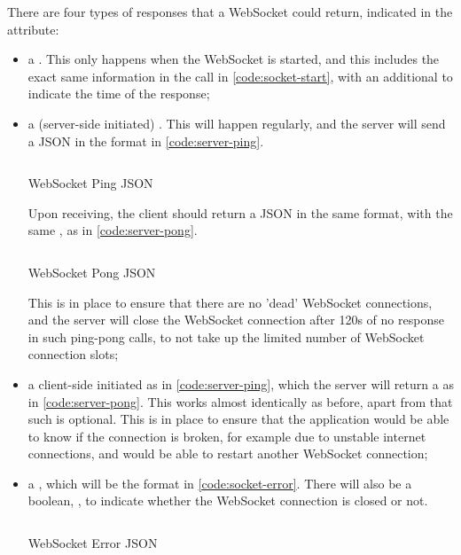 There are four types of responses that a WebSocket could return, indicated in the  attribute:
\begin{itemize}
    \item a . This only happens when the WebSocket is started, and this includes the exact same information in the  call in \autoref{code:socket-start}, with an additional  to indicate the time of the response;
    \item a (server-side initiated) . This will happen regularly, and the server will send a JSON in the format in \autoref{code:server-ping}.
          \begin{listing}[htp]
              \inputminted{json}{code/ServerPing.json}
              \caption{WebSocket Ping JSON}
              \label{code:server-ping}
          \end{listing}

          Upon receiving, the client should return a  JSON in the same format, with the same , as in \autoref{code:server-pong}.

          \begin{listing}[htp]
              \inputminted{json}{code/ServerPong.json}
              \caption{WebSocket Pong JSON}
              \label{code:server-pong}
          \end{listing}

          This is in place to ensure that there are no 'dead' WebSocket connections, and the server will close the WebSocket connection after 120s of no response in such ping-pong calls, to not take up the limited number of WebSocket connection slots;
    \item a client-side initiated  as in \autoref{code:server-ping}, which the server will return a  as in \autoref{code:server-pong}. This works almost identically as before, apart from that such  is optional. This is in place to ensure that the application would be able to know if the connection is broken, for example due to unstable internet connections, and would be able to restart another WebSocket connection;
    \item a , which will be the format in \autoref{code:socket-error}. There will also be a boolean, , to indicate whether the WebSocket connection is closed or not.

          \begin{listing}[htp]
              \inputminted{json}{code/SocketError.json}
              \caption{WebSocket Error JSON}
              \label{code:socket-error}
          \end{listing}


\end{itemize}
